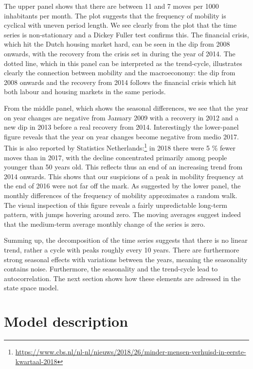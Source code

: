 \documentclass[]{article}
\let\rmarkdownfootnote\footnote%
\def\footnote{\protect\rmarkdownfootnote}
\begin{document}
The upper panel shows that there are between 11 and 7 moves per 1000
inhabitants per month. The plot suggests that the frequency of mobility
is cyclical with uneven period length. We see clearly from the plot that
the time series is non-stationary and a Dickey Fuller test confirms
this. The financial crisis, which hit the Dutch housing market hard, can
be seen in the dip from 2008 onwards, with the recovery from the crisis
set in during the year of 2014. The dotted line, which in this panel can
be interpreted as the trend-cycle, illustrates clearly the connection
between mobility and the macroeconomy: the dip from 2008 onwards and the
recovery from 2014 follows the financial crisis which hit both labour
and housing markets in the same periods.

From the middle panel, which shows the seasonal differences, we see that
the year on year changes are negative from January 2009 with a recovery
in 2012 and a new dip in 2013 before a real recovery from 2014.
Interestingly the lower-panel figure reveals that the year on year
changes become negative from medio 2017. This is also reported by
Statistics
Netherlands:\footnote{\url{https://www.cbs.nl/nl-nl/nieuws/2018/26/minder-mensen-verhuisd-in-eerste-kwartaal-2018}}
in 2018 there were 5 \% fewer moves than in 2017, with the decline
concentrated primarily among people younger than 50 years old. This
reflects thus an end of an increasing trend from 2014 onwards. This
shows that our suspicions of a peak in mobility frequency at the end of
2016 were not far off the mark. As suggested by the lower panel, the
monthly differences of the frequency of mobility approximates a random
walk. The visual inspection of this figure reveals a fairly
unpredictable long-term pattern, with jumps hovering around zero. The
moving averages suggest indeed that the medium-term average monthly
change of the series is zero.

Summing up, the decomposition of the time series suggests that there is
no linear trend, rather a cycle with peaks roughly every 10 years. There
are furthermore strong seasonal effects with variations between the
years, meaning the seasonality contains noise. Furthermore, the
seasonality and the trend-cycle lead to autocorrelation. The next
section shows how these elements are adressed in the state space model.

\section{Model description}\label{model-description}
\end{document}
